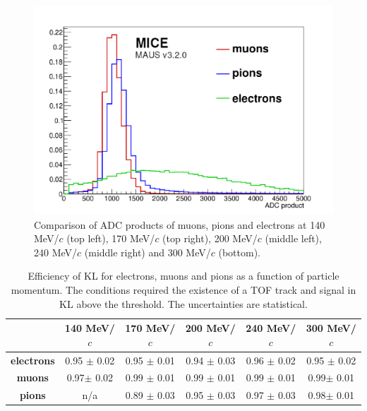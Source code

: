 \begin{figure}[htb!]
\begin{center}
 		\includegraphics[width=0.45\columnwidth]{./04-KL/Figures/mu_vs_pi_vs_e_300MEV.pdf}
 		\caption{Comparison of ADC products of muons, pions and electrons at 140 MeV/$c$ (top left), 170 MeV/$c$ (top right), 200 MeV/$c$ (middle left), 240 MeV/$c$ (middle right) and 300 MeV/$c$ (bottom).}
 		\label{fig:KL4}
 	\end{center}
\end{figure}

       
  \begin{table}[!htb]
  	\begin{center}
  		\begin{tabular}{c|c|c|c|c|c} 
  			                   & \textbf{140 MeV/$c$} & \textbf{170 MeV/$c$} & \textbf{200 MeV/$c$}	&\textbf{240 MeV/$c$} &\textbf{300 MeV/$c$}\\
  			\hline
  			\textbf{electrons} & 0.95 $\pm$ 0.02  & 0.95 $\pm$ 0.01 & 0.94 $\pm$ 0.03 &  0.96 $\pm$ 0.02 &  0.95 $\pm$ 0.02 \\
  			\hline
  			\textbf{muons}     & 0.97$\pm$ 0.02 & 0.99 $\pm$ 0.01  & 0.99 $\pm$  0.01 & 0.99 $\pm$ 0.01 & 0.99$\pm$ 0.01\\
  			\hline
  			\textbf{pions}     & n/a  & 0.89 $\pm$ 0.03  & 0.95 $\pm$ 0.03 & 0.97 $\pm$ 0.03 & 0.98$\pm$ 0.01\\
  		\end{tabular}
  		\caption{Efficiency of KL for electrons, muons and pions as a function of particle momentum. The conditions required the existence of a TOF track and signal in KL above the threshold. The uncertainties are statistical.}
  		\label{tab:KL_eff}
  	\end{center}
  \end{table}

